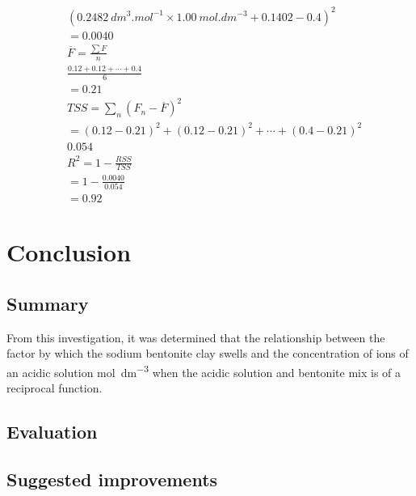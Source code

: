 \documentclass[11pt, letterpaper]{article}
\begin{document}
\begin{paracol}{2}
\begin{align*}
         & (\SI{0.2482}{dm^3.mol^{-1}}\times\SI{1.00}{mol.dm^{-3}} + 0.1402 - 0.4)^2
        \\
         & = 0.0040
        \\
         & \overline{F} = \frac{\sum F}{n}
        \\
         & \frac{0.12 + 0.12 + \cdots + 0.4}{6}
        \\
         & = 0.21
        \\
         & TSS = \sum_{n} (F_n - \overline{F})^2
        \\
         & = (0.12 - 0.21)^2 + (0.12 - 0.21)^2 + \cdots + (0.4 - 0.21)^2
        \\
         & 0.054
        \\
         & R^2 = 1 - \frac{RSS}{TSS}
        \\
         & = 1 - \frac{0.0040}{0.054}
        \\
         & = 0.92
    \end{align*}
\end{paracol}
\endgroup

\section{Conclusion}

\subsection{Summary}

From this investigation, it was determined that the relationship
between the factor by which the sodium bentonite clay swells
and the concentration of  ions of an acidic solution \unit{mol.dm^{-3}}
when the acidic solution and bentonite mix is of a reciprocal function.


\subsection{Evaluation}


\subsection{Suggested improvements}




\end{document}
